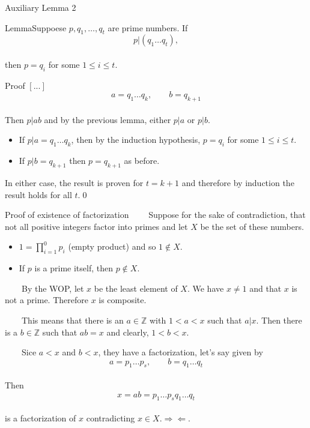 \documentclass{beamer}
\def\bl[#1]#2{\begin{block}{#1}#2\end{block}}
\def\itemb{\begin{itemize}}
\def\iteme{\end{itemize}}
\begin{document}
\begin{frame}{Auxiliary Lemma 2}
\bl[Lemma]{Suppoese $p,q_1,\dots, q_t$ are prime numbers. If\vspace{-0.2cm}
\[
p|(q_1\dots q_t),
\]\vspace{-0.6cm}\\
then $p=q_i$ for some $1\leq i\leq t$.}
\bl[Proof]{
$[...]$\vspace{-0.3cm}
\[
a=q_1\dots q_k,\qquad b=q_{k+1}
\]\vspace{-0.6cm}\\
Then $p|ab$ and by the previous lemma, either $p|a$ or $p|b$.
\itemb
\item If $p|a=q_1\dots q_k$, then by the induction hypothesis, $p=q_i$ for some $1\leq i\leq t$.
\item If $p|b=q_{k+1}$ then $p=q_{k+1}$ as before.
\iteme
In either case, the result is proven for $t=k+1$ and therefore by induction the result holds for all $t$.\qed
}

\end{frame}

\begin{frame}{Proof of existence of factorization}
~~~~Suppose for the sake of contradiction, that not all positive integers factor into primes and let $X$ be the set of these numbers.
\itemb
\item $1=\prod_{i=1}^{0}p_i$ (empty product) and so $1\notin X$.
\item If $p$ is a prime itself, then $p\notin X$.
\iteme
~~~~By the WOP, let $x$ be the least element of $X$. We have $x\neq 1$ and that $x$ is not a prime. Therefore $x$ is composite.

~~~~This means that there is an $a\in\mathbb{Z}$ with $1<a<x$ such that $a|x$. Then there is a $b\in\mathbb{Z}$ such that $ab=x$ and clearly, $1<b<x$. 

~~~~Sice $a<x$ and $b<x$, they have a factorization, let's say given by\vspace{-0.2cm}
\[
a=p_1\dots p_s,\qquad b=q_1\dots q_t
\]\vspace{-0.6cm}\\
Then \vspace{-0.2cm}
\[
x=ab=p_1\dots p_sq_1\dots q_t
\]\vspace{-0.6cm}\\
is a factorization of $x$ contradicting $x\in X$.$\Rightarrow\Leftarrow$.
\end{frame}
\end{document}

